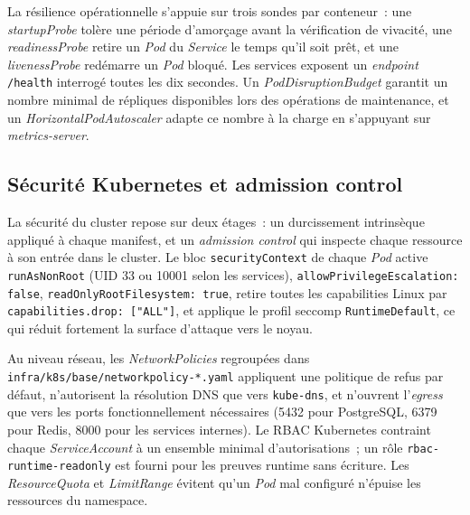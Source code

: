 La résilience opérationnelle s'appuie sur trois sondes par conteneur~:
une \emph{startupProbe} tolère une période d'amorçage avant la
vérification de vivacité, une \emph{readinessProbe} retire un \emph{Pod}
du \emph{Service} le temps qu'il soit prêt, et une \emph{livenessProbe}
redémarre un \emph{Pod} bloqué. Les services exposent un \emph{endpoint}
\texttt{/health} interrogé toutes les dix secondes. Un
\emph{PodDisruptionBudget} garantit un nombre minimal de répliques
disponibles lors des opérations de maintenance, et un
\emph{HorizontalPodAutoscaler} adapte ce nombre à la charge en
s'appuyant sur \emph{metrics-server}.

\subsection{Sécurité Kubernetes et admission control}
\label{subsec:concepts-securite-k8s}

La sécurité du cluster repose sur deux étages~: un durcissement
intrinsèque appliqué à chaque manifest, et un \emph{admission control}
qui inspecte chaque ressource à son entrée dans le cluster. Le bloc
\texttt{securityContext} de chaque \emph{Pod} active \texttt{runAsNonRoot}
(UID 33 ou 10001 selon les services), \texttt{allowPrivilegeEscalation:
false}, \texttt{readOnlyRootFilesystem: true}, retire toutes les
capabilities Linux par \texttt{capabilities.drop: ["ALL"]}, et applique
le profil seccomp \texttt{RuntimeDefault}, ce qui réduit fortement la
surface d'attaque vers le noyau.

Au niveau réseau, les \emph{NetworkPolicies} regroupées dans
\texttt{infra/k8s/base/networkpolicy-*.yaml} appliquent une politique de
refus par défaut, n'autorisent la résolution DNS que vers
\texttt{kube-dns}, et n'ouvrent l'\emph{egress} que vers les ports
fonctionnellement nécessaires (5432 pour PostgreSQL, 6379 pour Redis,
8000 pour les services internes). Le RBAC Kubernetes contraint chaque
\emph{ServiceAccount} à un ensemble minimal d'autorisations~; un rôle
\texttt{rbac-runtime-readonly} est fourni pour les preuves runtime sans
écriture. Les \emph{ResourceQuota} et \emph{LimitRange} évitent qu'un
\emph{Pod} mal configuré n'épuise les ressources du namespace.

